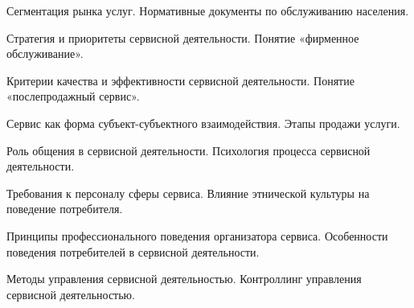 \documentclass[
	14pt,
	a4paper,
	]
	{scrartcl}
\begin{document}
\newpage


\shapk
{}
\setcounter{zad}{0}

\vfill
\z Сегментация рынка услуг.
 \vfill
\z Нормативные документы по обслуживанию населения.
 \vfill

\vfill

\newpage


\shapk
{}
\setcounter{zad}{0}

\vfill
\z Стратегия и приоритеты сервисной деятельности.
 \vfill
\z Понятие «фирменное обслуживание».
 \vfill

\vfill

\newpage


\shapk
{}
\setcounter{zad}{0}

\vfill
\z Критерии качества и эффективности сервисной деятельности.
 \vfill
\z Понятие «послепродажный сервис».
 \vfill

\vfill

\newpage


\shapk
{}
\setcounter{zad}{0}

\vfill
\z Сервис как форма субъект-субъектного взаимодействия.
 \vfill
\z Этапы продажи услуги.
 \vfill

\vfill

\newpage


\shapk
{}
\setcounter{zad}{0}

\vfill
\z Роль общения в сервисной деятельности.
 \vfill
\z Психология процесса сервисной деятельности.
 \vfill

\vfill

\newpage


\shapk
{}
\setcounter{zad}{0}

\vfill
\z Требования к персоналу сферы сервиса.
 \vfill
\z Влияние этнической культуры на поведение потребителя.
 \vfill

\vfill

\newpage


\shapk
{}
\setcounter{zad}{0}

\vfill
\z Принципы профессионального поведения организатора сервиса.
 \vfill
\z Особенности поведения потребителей в сервисной деятельности.
 \vfill

\vfill

\newpage


\shapk
{}
\setcounter{zad}{0}

\vfill
\z Методы управления сервисной деятельностью.
 \vfill
\z Контроллинг управления сервисной деятельностью.
 \vfill

\vfill

\newpage
\end{document}
